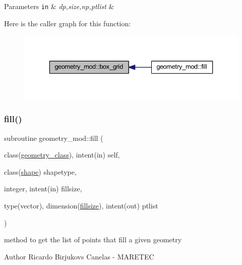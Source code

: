 \begin{DoxyParams}[1]{Parameters}
\mbox{\tt in}  & {\em dp,size,np,ptlist} & \\
\hline
\end{DoxyParams}
Here is the caller graph for this function\+:\nopagebreak
\begin{figure}[H]
\begin{center}
\leavevmode
\includegraphics[width=336pt]{namespacegeometry__mod_ae87e4ecff2d21a839da2b82919b5fd0b_icgraph}
\end{center}
\end{figure}
\mbox{\label{namespacegeometry__mod_a095a8b47b3c23e154dcd31ab1441a065}} 
\subsubsection{\texorpdfstring{fill()}{fill()}}
{\footnotesize\ttfamily subroutine geometry\+\_\+mod\+::fill (\begin{DoxyParamCaption}\item[{class(\hyperlink{structgeometry__mod_1_1geometry__class}{geometry\+\_\+class}), intent(in)}]{self,  }\item[{class(\hyperlink{structgeometry__mod_1_1shape}{shape})}]{shapetype,  }\item[{integer, intent(in)}]{fillsize,  }\item[{type(vector), dimension(\hyperlink{namespacegeometry__mod_a92602e1198d3607613ea2722fb002685}{fillsize}), intent(out)}]{ptlist }\end{DoxyParamCaption})\hspace{0.3cm}{\ttfamily [private]}}



method to get the list of points that fill a given geometry 

\begin{DoxyAuthor}{Author}
Ricardo Birjukovs Canelas -\/ M\+A\+R\+E\+T\+EC 
\end{DoxyAuthor}

